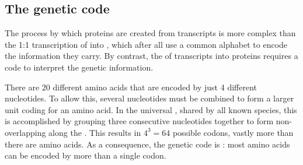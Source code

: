 
\subsection{The genetic code}

The process by which proteins are created from \mrna transcripts is more complex
than the 1:1 transcription of \dna into \rna, which after all use a common
alphabet to encode the information they carry. By contrast, the
 of \mrna transcripts into proteins requires a code to
interpret the genetic information.

There are \num{20} different amino acids that are encoded by just \num{4}
different nucleotides. To allow this, several nucleotides must be combined to
form a larger unit coding for an amino acid. In the universal , shared by all known species, this is accomplished by grouping three
consecutive nucleotides together to form non-overlapping  along
the \mrna. This results in \(4^3 = 64\) possible codons, vastly more than there
are amino acids. As a consequence, the genetic code is : most
amino acids can be encoded by more than a single codon.

